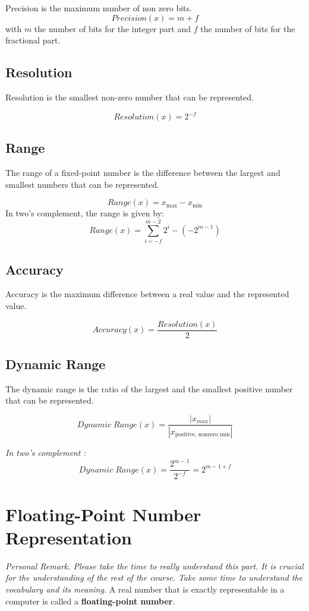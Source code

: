 \documentclass[12pt,openany]{book}
\begin{document}
			      	Precision is the maximum number of non zero bits.
			      	$$Precision(x) = m + f$$ with \(m\) the number of bits for the integer part and \(f\) the number of bits for the fractional part.
			      	
			      	\subsection{Resolution}
			      	Resolution is the smallest non-zero number that can be represented.
			      	
			      	$$Resolution(x) = 2^{-f}$$
			      	
			      	
			      	\subsection{Range}
			      	The range of a fixed-point number is the difference between the largest and smallest numbers that can be represented.
			      	
			      	\[Range(x) = x_{\text{max}} - x_{\text{min}}\]
			      	\newblock
			      	\newline
			      	In two's complement, the range is given by:
			      	\[ Range(x) = \displaystyle\sum_{i=-f}^{m-2} 2^i - \left( -2^{m-1} \right)\]
			      	
			      	\subsection{Accuracy}
			      	Accuracy is the maximum difference between a real value and the represented value.
			      	
			      	$$Accuracy(x) = \frac{Resolution(x)}{2}$$
			      	
			      	\subsection{Dynamic Range}
			      	The dynamic range is the ratio of the largest and the smallest positive number that can be represented.
			      	
			      	$$Dynamic \; Range(x) = \frac{|x_{max}|}{|x_{\text{positive, nonzero min}}|}$$
			      	
			      	\textit{In two's complement :}
			      	$$Dynamic \; Range(x) = \frac{2^{m-1}}{2^{-f}} = 2^{m-1+f}$$
			      	
			      	\section{Floating-Point Number Representation}
			      	\textit{Personal Remark. Please take the time to really understand this part. It is crucial for the understanding of the rest of the course. Take some time to understand the vocabulary and its meaning.}\newline
			      	\vskip 0.5cm
			      	A real number that is exactly representable in a computer is called a \textbf{floating-point number}. 
\end{document}
